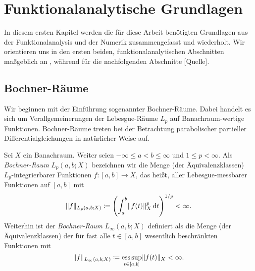 
\chapter{Funktionalanalytische Grundlagen} %
\label{chapter:grundlagen}


In diesem ersten Kapitel werden die für diese Arbeit benötigten Grundlagen aus der Funktionalanalysis und der Numerik zusammengefasst und wiederholt.
Wir orientieren uns in den ersten beiden, funktionalanalytischen Abschnitten maßgeblich an \textcite{Dautray:1992by,Lions:1972tg}, während für die nachfolgenden Abschnitte [Quelle].


\section{Bochner-Räume} %
\label{sec:gl:br:bochner_raeume}

Wir beginnen mit der Einführung sogenannter Bochner-Räume.
Dabei handelt es sich um Verallgemeinerungen der Lebesgue-Räume $L_{p}$ auf Banachraum-wertige Funktionen.
Bochner-Räume treten bei der Betrachtung parabolischer partieller Differentialgleichungen in natürlicher Weise auf.

\begin{Definition}
\label{def:gl:br:bochner_raum}
    Sei $X$ ein Banachraum.
    Weiter seien $- \infty \leq a < b \leq \infty$ und $1 \leq p < \infty$.
    Als \emph{Bochner-Raum} $L_{p}(a, b; X)$ bezeichnen wir die Menge (der Äquivalenzklassen) $L_{p}$-integrierbarer Funktionen $f \colon [a, b] \to X$, das heißt, aller Lebesgue-messbarer Funktionen auf $[a, b]$ mit
    \begin{equation}
        \lVert f\rVert_{L_{p}(a, b; X)} \coloneqq \left( \int_{a}^{b} \lVert f(t)\rVert_{X}^{p} \mathop{}\!\mathrm{d} t \right)^{1 / p} < \infty.
    \end{equation}
    Weiterhin ist der \emph{Bochner-Raum} $L_{\infty}(a, b; X)$ definiert als die Menge (der Äquivalenzklassen) der für fast alle $t \in [a, b]$ wesentlich beschränkten Funktionen mit
    \begin{equation}
        \lVert f\rVert_{L_{\infty}(a, b; X)} \coloneqq \operatorname*{ess\,sup}_{t \in [a, b]} \lVert f(t)\rVert_{X} < \infty.
    \end{equation}
\end{Definition}


